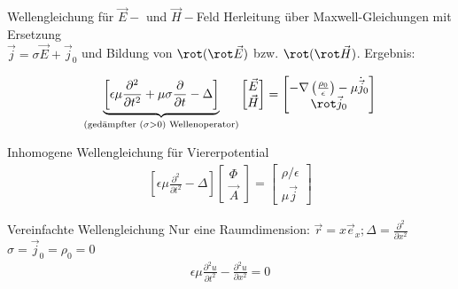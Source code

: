 \documentclass[a6paper]{kartei}
\begin{document}
\begin{karte}{Wellengleichung für $\vec{E}-$ und $\vec{H}-$Feld}
Herleitung über Maxwell-Gleichungen mit Ersetzung \\ $\vec{j} = \sigma \vec{E} + \vec{j}_{0}$ und Bildung von $\rot(\rot \vec{E})$ bzw. $\rot(\rot \vec{H})$. Ergebnis:

\begin{align}
\underbrace{\left[ \epsilon \mu \frac{\partial^{2}}{\partial t^{2}} + \mu \sigma \frac{\partial}{\partial t} - \Delta \right]}_{(\text{gedämpfter (} \sigma >0 \text{) Wellenoperator)}} \begin{bmatrix} \vec{E} \\ \vec{H} \end{bmatrix} = \begin{bmatrix} - \nabla \left( \frac{\rho_{0}}{\epsilon} \right) - \mu \dot{\vec{j}}_{0} \\ \rot \vec{j}_{0} \end{bmatrix}
\end{align}
\end{karte}

\begin{karte}{Inhomogene Wellengleichung für Viererpotential}
\begin{eqnarray}
\left[\epsilon \mu \frac{\partial^{2}}{\partial t^{2}} - \Delta \right] \begin{bmatrix} \Phi \\ \vec{A} \end{bmatrix} =  \begin{bmatrix} \rho/\epsilon \\ \mu\vec{j} \end{bmatrix}
 \end{eqnarray}
\end{karte}

\begin{karte}{Vereinfachte Wellengleichung}
Nur eine Raumdimension: $\vec{r} = x \vec{e}_{x}; \Delta = \frac{\partial^{2}}{\partial x^{2}}$ \\
$\sigma = \vec{j}_{0} = \rho_{0} = 0$
\begin{eqnarray}
\epsilon \mu \frac{\partial^{2}u}{\partial t^{2}} - \frac{\partial^{2} u}{\partial x^{2}} = 0
\end{eqnarray}
\end{karte}
\end{document}
